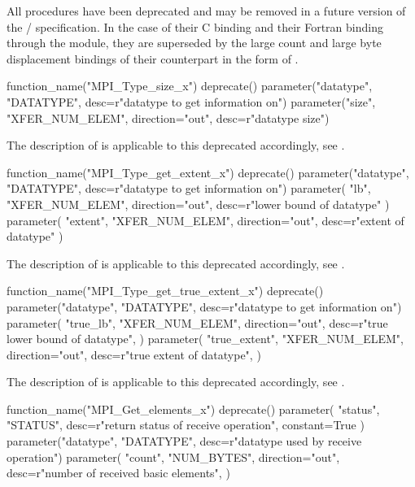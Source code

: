 \deprecatedsep
All  procedures have been deprecated and may be removed in a future version of the \MPI/ specification.
In the case of their C binding and their Fortran binding through the  module, they are superseded by the large count and large byte displacement bindings of their counterpart in the form of .

\begin{mpi-binding}
    function_name("MPI_Type_size_x")
    deprecate()
    parameter("datatype", "DATATYPE", desc=r"datatype to get information on")
    parameter("size", "XFER_NUM_ELEM", direction="out", desc=r"datatype size")
\end{mpi-binding}

The description of  is applicable to this deprecated  accordingly,
see .

%
\begin{mpi-binding}
    function_name("MPI_Type_get_extent_x")
    deprecate()
    parameter("datatype", "DATATYPE", desc=r"datatype to get information on")
    parameter(
        "lb", "XFER_NUM_ELEM", direction="out", desc=r"lower bound of datatype"
    )
    parameter(
        "extent", "XFER_NUM_ELEM", direction="out", desc=r"extent of datatype"
    )
\end{mpi-binding}

The description of  is applicable to this deprecated  accordingly,
see .

%
\begin{mpi-binding}
    function_name("MPI_Type_get_true_extent_x")
    deprecate()
    parameter("datatype", "DATATYPE", desc=r"datatype to get information on")
    parameter(
        "true_lb",
        "XFER_NUM_ELEM",
        direction="out",
        desc=r"true lower bound of datatype",
    )
    parameter(
        "true_extent",
        "XFER_NUM_ELEM",
        direction="out",
        desc=r"true extent of datatype",
    )
\end{mpi-binding}

The description of  is applicable to this deprecated  accordingly,
see .

\label{func:mpi-get-elements-x}
%
\begin{mpi-binding}
    function_name("MPI_Get_elements_x")
    deprecate()
    parameter(
        "status", "STATUS", desc=r"return status of receive operation", constant=True
    )
    parameter("datatype", "DATATYPE", desc=r"datatype used by receive operation")
    parameter(
        "count",
        "NUM_BYTES",
        direction="out",
        desc=r"number of received basic elements",
    )
\end{mpi-binding}

